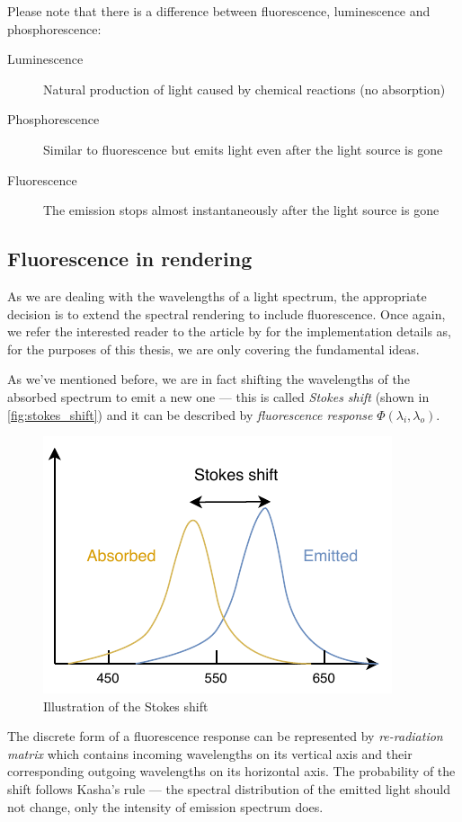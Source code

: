 Please note that there is a difference between fluorescence, luminescence and phosphorescence:

\begin{description}
	\item[Luminescence] Natural production of light caused by chemical reactions (no absorption)
	\item[Phosphorescence] Similar to fluorescence but emits light even after the light source is gone
	\item[Fluorescence] The emission stops almost instantaneously after the light source is gone
\end{description}

\subsection{Fluorescence in rendering}
As we are dealing with the wavelengths of a light spectrum, the appropriate decision is to extend the spectral rendering to include fluorescence. Once again, we refer the interested reader to the article by \citet{mojzik2018handling} for the implementation details as, for the purposes of this thesis,  we are only covering the fundamental ideas.

As we've mentioned before, we are in fact shifting the wavelengths of the absorbed spectrum to emit a new one --- this is called \emph{Stokes shift} (shown in \autoref{fig:stokes_shift}) and it can be described by \emph{fluorescence response} $\Phi(\lambda_i,\lambda_o)$.

\begin{figure}
	\centering
	\includegraphics[width=0.7\linewidth]{img/stokes_shift.pdf}
	\caption{Illustration of the Stokes shift}
	\label{fig:stokes_shift}
\end{figure}

The discrete form of a fluorescence response can be represented by \emph{re-radiation matrix} which contains incoming wavelengths on its vertical axis and their corresponding outgoing wavelengths on its horizontal axis. The probability of the shift follows Kasha's rule --- the spectral distribution of the emitted light should not change, only the intensity of emission spectrum does.

